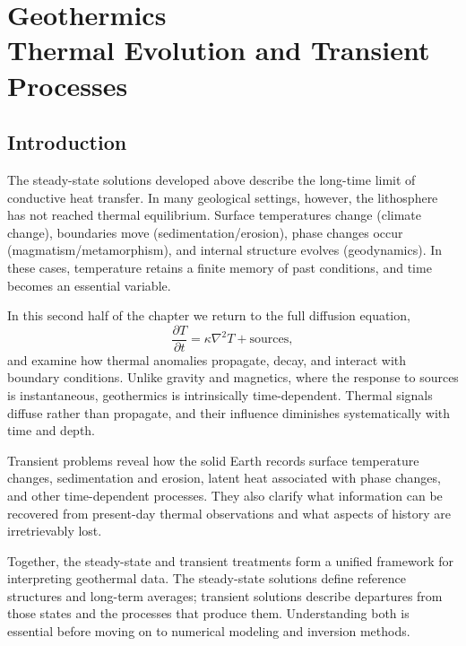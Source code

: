 \def\hfu{mW~m\ensuremath{^{-2}}}
\def\hgu{\ensuremath{\mu}W~m\ensuremath{^{-3}}}
\def\tcu{W~m\ensuremath{^{-1}}K\ensuremath{^{-1}}}
\chapter[Geothermics: Thermal Evolution and Transient Processes]{Geothermics\\ {\LARGE Thermal Evolution and Transient Processes}} \label{ch:geothermics2}

\section{Introduction}

The steady-state solutions developed above describe the long-time limit of conductive heat transfer. In many geological settings, however, the lithosphere has not reached thermal equilibrium. Surface temperatures change (climate change), boundaries move (sedimentation/erosion), phase changes occur (magmatism/metamorphism), and internal structure evolves (geodynamics). In these cases, temperature retains a finite memory of past conditions, and time becomes an essential variable.

In this second half of the chapter we return to the full diffusion equation,
\begin{equation}
\frac{\partial T}{\partial t} = \kappa \nabla^2 T + \mathrm{sources},
\end{equation}
and examine how thermal anomalies propagate, decay, and interact with boundary conditions. Unlike gravity and magnetics, where the response to sources is instantaneous, geothermics is intrinsically time-dependent. Thermal signals diffuse rather than propagate, and their influence diminishes systematically with time and depth.

Transient problems reveal how the solid Earth records surface temperature changes, sedimentation and erosion, latent heat associated with phase changes, and other time-dependent processes. They also clarify what information can be recovered from present-day thermal observations and what aspects of history are irretrievably lost.

Together, the steady-state and transient treatments form a unified framework for interpreting geothermal data. The steady-state solutions define reference structures and long-term averages; transient solutions describe departures from those states and the processes that produce them. Understanding both is essential before moving on to numerical modeling and inversion methods.

